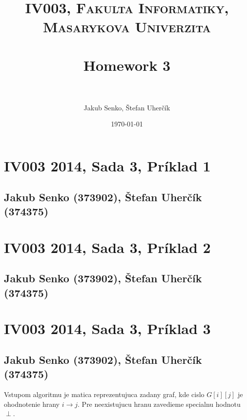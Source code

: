 \documentclass[paper=a4, fontsize=11pt]{scrartcl} %
\title{	
\normalfont \normalsize 
\textsc{IV003, Fakulta Informatiky, Masarykova Univerzita} \\ [25pt] %
\horrule{0.5pt} \\[0.4cm] %
\huge Homework 3 \\ %
\horrule{2pt} \\[0.5cm] %
}
\author{Jakub Senko, Štefan Uherčík} %
\date{\normalsize\today} %
\numberwithin{equation}{section} %
\numberwithin{figure}{section} %
\numberwithin{table}{section} %
\begin{document}


\section*{IV003 2014, Sada 3, Príklad 1}
\subsection*{Jakub Senko (373902), Štefan Uherčík (374375)}

\pagebreak


\section*{IV003 2014, Sada 3, Príklad 2}
\subsection*{Jakub Senko (373902), Štefan Uherčík (374375)}

\pagebreak


\section*{IV003 2014, Sada 3, Príklad 3}
\subsection*{Jakub Senko (373902), Štefan Uherčík (374375)}

Vstupom algoritmu je matica reprezentujuca zadany graf, kde cislo $G[i][j]$ je ohodnotenie hrany $i \to j$. Pre neexistujucu hranu zavedieme specialnu hodnotu $\perp$.
\end{document}
